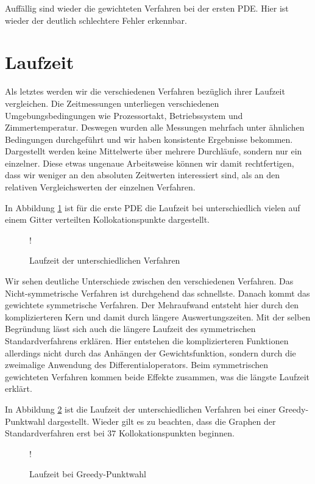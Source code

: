 Auffällig sind wieder die gewichteten Verfahren bei der ersten \ac{PDE}. Hier ist wieder der deutlich schlechtere Fehler erkennbar.

\section{Laufzeit}
Als letztes werden wir die verschiedenen Verfahren bezüglich ihrer Laufzeit vergleichen. Die Zeitmessungen unterliegen verschiedenen Umgebungsbedingungen wie Prozessortakt, Betriebssystem und Zimmertemperatur. Deswegen wurden alle Messungen mehrfach unter ähnlichen Bedingungen durchgeführt und wir haben konsistente Ergebnisse bekommen. Dargestellt werden keine Mittelwerte über mehrere Durchläufe, sondern nur ein einzelner. Diese etwas ungenaue Arbeitsweise können wir damit rechtfertigen, dass wir weniger an den absoluten Zeitwerten interessiert sind, als an den relativen Vergleichswerten der einzelnen Verfahren.

In Abbildung \ref{fig:Laufzeit} ist für die erste \ac{PDE} die Laufzeit bei unterschiedlich vielen auf einem Gitter verteilten Kollokationspunkte dargestellt.
\begin{figure}[ht]
\centering
\resizebox {\columnwidth} {!} {

}
\caption{Laufzeit der unterschiedlichen Verfahren}
\label{fig:Laufzeit}
\end{figure}

Wir sehen deutliche Unterschiede zwischen den verschiedenen Verfahren. Das Nicht-symmetrische Verfahren ist durchgehend das schnellste. Danach kommt das gewichtete symmetrische Verfahren. Der Mehraufwand entsteht hier durch den komplizierteren Kern und damit durch längere Auswertungszeiten. Mit der selben Begründung lässt sich auch die längere Laufzeit des symmetrischen Standardverfahrens erklären. Hier entstehen die komplizierteren Funktionen allerdings nicht durch das Anhängen der Gewichtsfunktion, sondern durch die zweimalige Anwendung des Differentialoperators. Beim symmetrischen gewichteten Verfahren kommen beide Effekte zusammen, was die längste Laufzeit erklärt.

In Abbildung \ref{fig:Laufzeit-greedy} ist die Laufzeit der unterschiedlichen Verfahren bei einer Greedy-Punktwahl dargestellt. Wieder gilt es zu beachten, dass die Graphen der Standardverfahren erst bei $37$ Kollokationspunkten beginnen.
\begin{figure}[ht]
\centering
\resizebox {\columnwidth} {!} {

}
\caption{Laufzeit bei Greedy-Punktwahl}
\label{fig:Laufzeit-greedy}
\end{figure}

